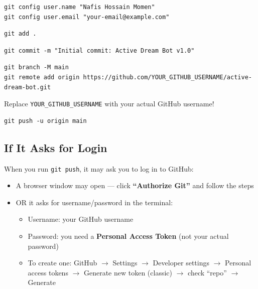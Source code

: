 \begin{lstlisting}[style=termstyle, title={Step 6.3: Configure your Git identity}]
git config user.name "Nafis Hossain Momen"
git config user.email "your-email@example.com"
\end{lstlisting}

\begin{lstlisting}[style=termstyle, title={Step 6.4: Add all files (except those in .gitignore)}]
git add .
\end{lstlisting}

\begin{lstlisting}[style=termstyle, title={Step 6.5: Create the first commit}]
git commit -m "Initial commit: Active Dream Bot v1.0"
\end{lstlisting}

\begin{lstlisting}[style=termstyle, title={Step 6.6: Connect to your GitHub repository}]
git branch -M main
git remote add origin https://github.com/YOUR_GITHUB_USERNAME/active-dream-bot.git
\end{lstlisting}

Replace \texttt{YOUR\_GITHUB\_USERNAME} with your actual GitHub username!

\begin{lstlisting}[style=termstyle, title={Step 6.7: Upload (push) the code}]
git push -u origin main
\end{lstlisting}

\subsection{If It Asks for Login}

When you run \texttt{git push}, it may ask you to log in to GitHub:
\begin{itemize}
    \item A browser window may open --- click \textbf{``Authorize Git''} and follow the steps
    \item OR it asks for username/password in the terminal:
    \begin{itemize}
        \item Username: your GitHub username
        \item Password: you need a \textbf{Personal Access Token} (not your actual password)
        \item To create one: GitHub $\rightarrow$ Settings $\rightarrow$ Developer settings $\rightarrow$ Personal access tokens $\rightarrow$ Generate new token (classic) $\rightarrow$ check ``repo'' $\rightarrow$ Generate
    \end{itemize}
\end{itemize}

